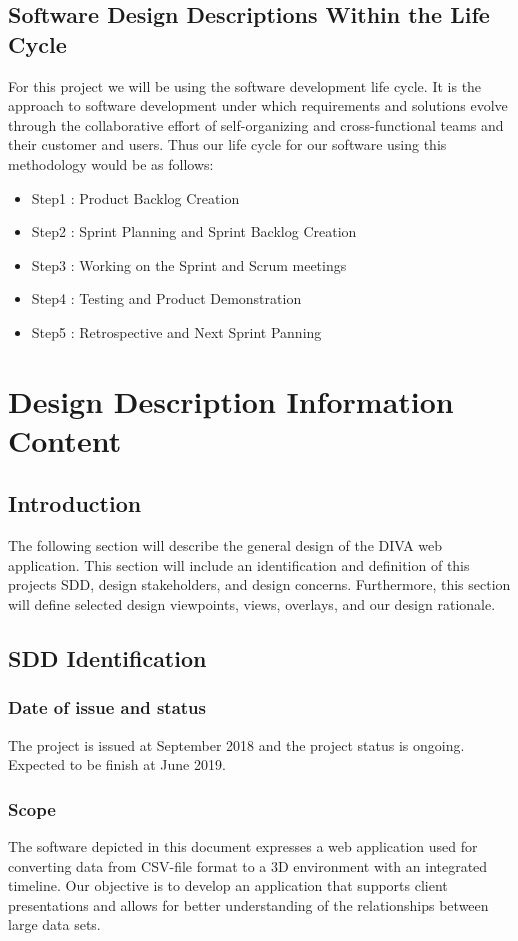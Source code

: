 \documentclass[journal,10pt,onecolumn,compsoc]{IEEEtran} \usepackage[margin=1.0in]{geometry} \usepackage{pdfpages}
\begin{document}
    \subsection{Software Design Descriptions Within the Life Cycle}
    For this project we will be using the software development life cycle. It is the approach to software development under which requirements and solutions evolve through the collaborative effort of self-organizing and cross-functional teams and their customer and users. Thus our life cycle for our software using this methodology would be as follows:
    \begin{itemize}
    \item Step1 : Product Backlog Creation
    \item Step2 : Sprint Planning and Sprint Backlog Creation 
    \item Step3 : Working on the Sprint and Scrum meetings
    \item Step4 : Testing and Product Demonstration
    \item Step5 : Retrospective and Next Sprint Panning
    \end{itemize}
\section{Design Description Information Content}
    \subsection{Introduction}
    The following section will describe the general design of the DIVA web application. This section will include an identification and definition of this projects SDD, design stakeholders, and design concerns. Furthermore, this section will define selected design viewpoints, views, overlays, and our design rationale. 
    \subsection{SDD Identification}
        \subsubsection{Date of issue and status}
        The project is issued at September 2018 and the project status is ongoing. Expected to be finish at June 2019.
        \subsubsection{Scope}
        The software depicted in this document expresses a web application used for converting data from CSV-file format to a 3D environment with an integrated timeline. Our objective is to develop an application that supports client presentations and allows for better understanding of the relationships between large data sets.
\end{document}
